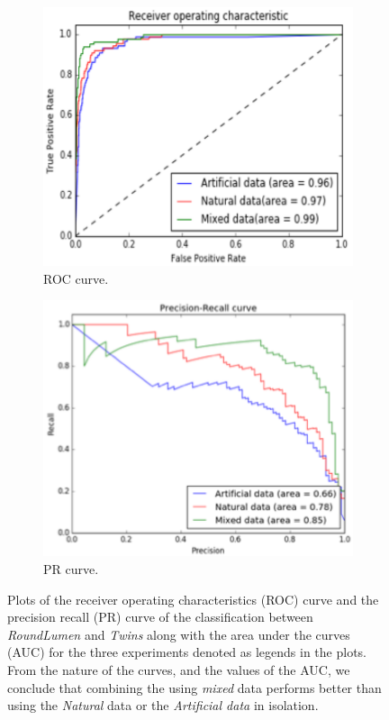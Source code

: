 \begin{figure}[ht!]
    \centering
    \begin{subfigure}[t]{0.5\textwidth}
     \centering
       \includegraphics[width=1.0\linewidth]{img/single_twins_ROC.pdf}
  \caption{ROC curve.}
        \label{fig:ROC1}   
    \end{subfigure}%
    \begin{subfigure}[t]{0.5\textwidth}
        \centering
          \includegraphics[width=1.0\linewidth]{img/single_twins_PRC.pdf}
  \caption{PR curve.}
        \label{fig:PRC1}
    \end{subfigure}%
    \caption{Plots of the receiver operating characteristics (ROC) curve and the precision recall (PR) curve of the classification between \textit{RoundLumen} and \textit{Twins} along with the area under the curves (AUC) for the three experiments denoted as legends in the plots. From the nature of the curves, and the values of the AUC, we conclude that combining the using \textit{mixed} data performs better than using the \textit{Natural} data or the \textit{Artificial data} in isolation.}
    \label{fig:ROC_PRC1}
\end{figure}


